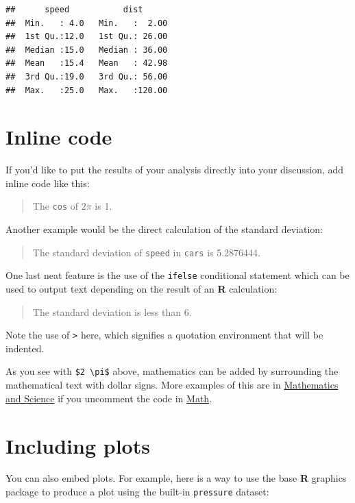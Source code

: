 \documentclass[print]{nuthesis}
\begin{document}
\begin{verbatim}
##      speed           dist       
##  Min.   : 4.0   Min.   :  2.00  
##  1st Qu.:12.0   1st Qu.: 26.00  
##  Median :15.0   Median : 36.00  
##  Mean   :15.4   Mean   : 42.98  
##  3rd Qu.:19.0   3rd Qu.: 56.00  
##  Max.   :25.0   Max.   :120.00
\end{verbatim}

\hypertarget{inline-code}{%
\section{Inline code}\label{inline-code}}

If you'd like to put the results of your analysis directly into your discussion, add inline code like this:

\begin{quote}
The \texttt{cos} of \(2 \pi\) is 1.
\end{quote}

Another example would be the direct calculation of the standard deviation:

\begin{quote}
The standard deviation of \texttt{speed} in \texttt{cars} is 5.2876444.
\end{quote}

One last neat feature is the use of the \texttt{ifelse} conditional statement which can be used to output text depending on the result of an \textbf{R} calculation:

\begin{quote}
The standard deviation is less than 6.
\end{quote}

Note the use of \texttt{\textgreater{}} here, which signifies a quotation environment that will be indented.

As you see with \texttt{\$2\ \textbackslash{}pi\$} above, mathematics can be added by surrounding the mathematical text with dollar signs. More examples of this are in \protect\hyperlink{math-sci}{Mathematics and Science} if you uncomment the code in \protect\hyperlink{math}{Math}.

\hypertarget{including-plots}{%
\section{Including plots}\label{including-plots}}

You can also embed plots. For example, here is a way to use the base \textbf{R} graphics package to produce a plot using the built-in \texttt{pressure} dataset:
\end{document}
